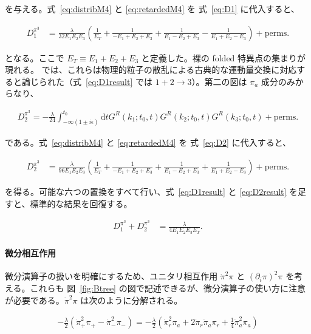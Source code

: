 \documentclass[a4paper,11pt]{ltjsarticle}
\numberwithin{equation}{section}
\def\pia{\pi_{a}}
\def\pir{\pi_{r}}
\newcommand{\dd}{\mathrm{d}}
\newcommand{\Eq}[1]{Eq.~(\ref{#1})}
\newcommand{\Eqs}[1]{Eqs.~(\ref{#1})}
\newcommand{\Fig}[1]{Fig.~{\ref{#1}}}
\renewcommand{\Eq}[1]{式~\eqref{#1}}
\renewcommand{\Eqs}[1]{式~\eqref{#1}}
\renewcommand{\Fig}[1]{図~\ref{#1}}
\begin{document}
を与える。\Eqs{eq:distribM4} と \eqref{eq:retardedM4} を \Eq{eq:D1} に代入すると、

\begin{align}\label{eq:D1result}
D^{\pi^3}_1 &=  \frac{\lambda}{32 E_1 E_2 E_3} \left( \frac{1}{E_T} + \frac{1}{-E_1 + E_2 + E_3} + \frac{1}{E_1 - E_2 + E_3} - \frac{1}{E_1 + E_2 - E_3}\right)+ \mathrm{perms}. 
\end{align}

となる。ここで $E_T\equiv E_1+E_2+E_3$ と定義した。裸の folded 特異点の集まりが現れる。\cite{Green:2020whw} では、これらは物理的粒子の散乱による古典的な運動量交換に対応すると論じられた（\Eq{eq:D1result} では $1+2\rightarrow3$）。第二の図は $\pia$ 成分のみからなり、

\begin{align}\label{eq:D2}
D^{\pi^3}_2 = - \frac{\lambda}{24} \int_{-\infty(1\pm i \epsilon)}^{t_0} \dd t G^R(k_1; t_0,t) G^R(k_2; t_0,t)G^R(k_3; t_0,t) + \mathrm{perms}. 
\end{align}

である。\Eqs{eq:distribM4} と \eqref{eq:retardedM4} を \Eq{eq:D2} に代入すると、

\begin{align}\label{eq:D2result}
D^{\pi^3}_2 &=   \frac{\lambda}{96 E_1 E_2 E_3} \left( \frac{1}{E_T} + \frac{1}{-E_1 + E_2 + E_3} + \frac{1}{E_1 - E_2 + E_3} + \frac{1}{E_1 + E_2 - E_3}\right)+ \mathrm{perms} .
\end{align}

を得る。可能な六つの置換をすべて行い、\Eqs{eq:D1result} と \eqref{eq:D2result} を足すと、標準的な結果を回復する。

\begin{align}\label{eq:std}
D^{\pi^3}_1 + D^{\pi^3}_2 &= \frac{\lambda}{4 E_1 E_2 E_3 E_T}.
\end{align}

\paragraph{微分相互作用} 微分演算子の扱いを明確にするため、ユニタリ相互作用 $\dot{\pi}^2\pi$ と $(\partial_i\pi)^2\pi$ を考える。これらも \Fig{fig:Btree} の図で記述できるが、微分演算子の使い方に注意が必要である。$\dot{\pi}^2\pi$ は次のように分解される。

\begin{align}\label{eq:timeder}
-\frac{\lambda}{2}\left(\dot{\pi}^2_+ \pi_+ - \dot{\pi}^2_- \pi_-\right) = -\frac{\lambda}{2}\left( \dot{\pi}_r^2 \pia + 2 \dot{\pi}_r \dot{\pi}_a \pir + \frac{1}{4} \dot{\pi}_a^2 \pia\right)
\end{align}
\end{document}
